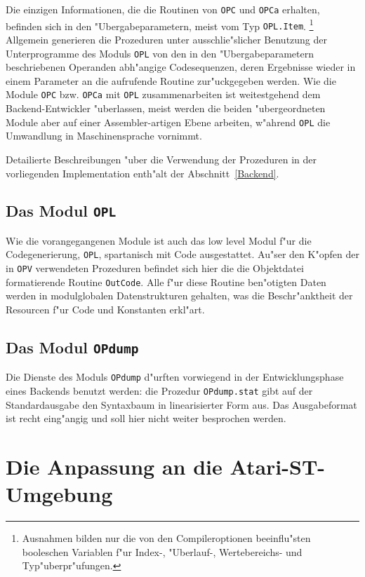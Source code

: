 Die einzigen Informationen, die die Routinen von {\tt OPC} und {\tt OPCa}
erhalten, befinden sich in den "Ubergabeparametern, meist vom Typ {\tt OPL.Item}.%
\footnote{Ausnahmen bilden nur die von den Compileroptionen beeinflu"sten
  booleschen Variablen f"ur Index-, "Uberlauf-, Wertebereichs- und
  Typ"uberpr"ufungen.}
Allgemein generieren die Prozeduren unter ausschlie"slicher Benutzung der
Unterprogramme des Moduls {\tt OPL} von den in den "Ubergabeparametern
beschriebenen Operanden abh"angige Codesequenzen, deren Ergebnisse wieder
in einem Parameter an die aufrufende Routine zur"uckgegeben werden.
Wie die Module {\tt OPC} bzw. {\tt OPCa} mit {\tt OPL} zusammenarbeiten
ist weitestgehend dem Backend-Entwickler "uberlassen, meist werden die beiden
"ubergeordneten Module aber auf einer Assembler-artigen Ebene arbeiten,
w"ahrend {\tt OPL} die Umwandlung in Maschinensprache vornimmt.

Detailierte Beschreibungen "uber die Verwendung der Prozeduren in der
vorliegenden Implementation enth"alt der Abschnitt~\ref{Backend}.

\subsection{Das Modul {\tt OPL}}
\label{OPL}

Wie die vorangegangenen Module ist auch das low level Modul f"ur
die Codegenerierung, {\tt OPL}, spartanisch mit Code ausgestattet.
Au"ser den K"opfen der in {\tt OPV} verwendeten Prozeduren befindet
sich hier die die Objektdatei formatierende Routine {\tt OutCode}.
Alle f"ur diese Routine ben"otigten Daten werden in modulglobalen
Datenstrukturen gehalten, was die Beschr"anktheit der Resourcen
f"ur Code und Konstanten erkl"art.

\subsection{Das Modul {\tt OPdump}}

Die Dienste des Moduls {\tt OPdump} d"urften vorwiegend in der
Entwicklungsphase eines Backends benutzt werden: die Prozedur
{\tt OPdump.stat} gibt auf der Standardausgabe den Syntaxbaum
in linearisierter Form aus.
Das Ausgabeformat ist recht eing"angig und soll hier nicht weiter
besprochen werden.

\newpage
\section{Die Anpassung an die Atari-ST-Umgebung}


